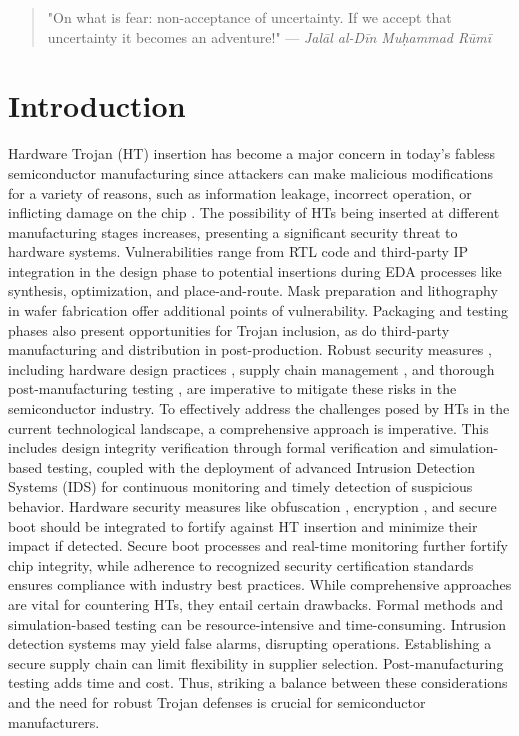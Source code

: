 \begingroup
\RaggedRight

\begin{quote}
"On what is fear: non-acceptance of uncertainty. If we accept that uncertainty it becomes an adventure!"
\newline
\hfill  — \textit{Jalāl al-Dīn Muḥammad Rūmī}
\end{quote}

\section*{Introduction}
Hardware Trojan (HT) insertion has become a major concern in today's fabless semiconductor manufacturing since attackers can make malicious modifications for a variety of reasons, such as information leakage, incorrect operation, or inflicting damage on the chip \cite{salmani2017hardware,  Regazzoni:HTDetection, Guin:HTDetection, Salmani:HTDetection}. The possibility of HTs being inserted at different manufacturing stages increases, presenting a significant security threat to hardware systems. Vulnerabilities range from RTL code and third-party IP integration in the design phase to potential insertions during EDA processes like synthesis, optimization, and place-and-route. Mask preparation \cite{belous2020methods} and lithography in wafer fabrication offer additional points of vulnerability. Packaging and testing phases also present opportunities for Trojan inclusion, as do third-party manufacturing and distribution in post-production. Robust security measures \cite{narasimhan2011tesr}, including hardware design practices \cite{muralidhar2021contrastive}, supply chain management \cite{chang2023supplier, panduro2023effective}, and thorough post-manufacturing testing \cite{monjur2023hardware}, are imperative to mitigate these risks in the semiconductor industry.
To effectively address the challenges posed by HTs in the current technological landscape, a comprehensive approach is imperative. This includes design integrity verification through formal verification \cite{nahiyan2017hardware} and simulation-based testing, coupled with the deployment of advanced Intrusion Detection Systems (IDS) for continuous monitoring and timely detection of suspicious behavior. Hardware security measures like obfuscation \cite{nishita2023hardware}, encryption \cite{chandra2023efficient}, and secure boot \cite{monjur2023hardware} should be integrated to fortify against HT insertion and minimize their impact if detected. Secure boot processes \cite{monjur2023hardware} and real-time monitoring further fortify chip integrity, while adherence to recognized security certification standards ensures compliance with industry best practices. 
While comprehensive approaches are vital for countering HTs, they entail certain drawbacks. Formal methods and simulation-based testing can be resource-intensive and time-consuming. Intrusion detection systems may yield false alarms, disrupting operations. %
Establishing a secure supply chain can limit flexibility in supplier selection. Post-manufacturing testing adds time and cost. 
Thus, striking a balance between these considerations and the need for robust Trojan defenses is crucial for semiconductor manufacturers.

